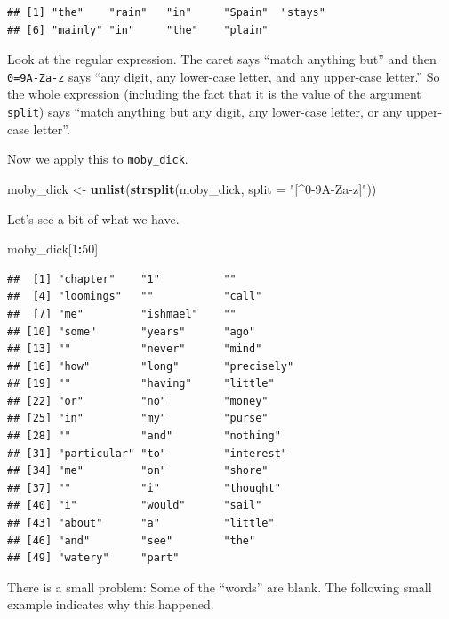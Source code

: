 \documentclass[
]{krantz}
\newenvironment{Shaded}{\begin{snugshade}}{\end{snugshade}}
\newcommand{\DataTypeTok}[1]{\textcolor[rgb]{0.13,0.29,0.53}{#1}}
\newcommand{\DecValTok}[1]{\textcolor[rgb]{0.00,0.00,0.81}{#1}}
\newcommand{\KeywordTok}[1]{\textcolor[rgb]{0.13,0.29,0.53}{\textbf{#1}}}
\newcommand{\NormalTok}[1]{#1}
\newcommand{\OperatorTok}[1]{\textcolor[rgb]{0.81,0.36,0.00}{\textbf{#1}}}
\newcommand{\StringTok}[1]{\textcolor[rgb]{0.31,0.60,0.02}{#1}}
\begin{document}
\begin{verbatim}
## [1] "the"    "rain"   "in"     "Spain"  "stays" 
## [6] "mainly" "in"     "the"    "plain"
\end{verbatim}

Look at the regular expression. The caret says ``match anything but'' and then \texttt{0=9A-Za-z} says ``any digit, any lower-case letter, and any upper-case letter.'' So the whole expression (including the fact that it is the value of the argument \texttt{split}) says ``match anything but any digit, any lower-case letter, or any upper-case letter''.

Now we apply this to \texttt{moby\_dick}.

\begin{Shaded}
\begin{Highlighting}[]
\NormalTok{moby\_dick \textless{}{-}}\StringTok{ }\KeywordTok{unlist}\NormalTok{(}\KeywordTok{strsplit}\NormalTok{(moby\_dick, }\DataTypeTok{split =} \StringTok{"[\^{}0{-}9A{-}Za{-}z]"}\NormalTok{))}
\end{Highlighting}
\end{Shaded}

Let's see a bit of what we have.

\begin{Shaded}
\begin{Highlighting}[]
\NormalTok{moby\_dick[}\DecValTok{1}\OperatorTok{:}\DecValTok{50}\NormalTok{]}
\end{Highlighting}
\end{Shaded}

\begin{verbatim}
##  [1] "chapter"    "1"          ""          
##  [4] "loomings"   ""           "call"      
##  [7] "me"         "ishmael"    ""          
## [10] "some"       "years"      "ago"       
## [13] ""           "never"      "mind"      
## [16] "how"        "long"       "precisely" 
## [19] ""           "having"     "little"    
## [22] "or"         "no"         "money"     
## [25] "in"         "my"         "purse"     
## [28] ""           "and"        "nothing"   
## [31] "particular" "to"         "interest"  
## [34] "me"         "on"         "shore"     
## [37] ""           "i"          "thought"   
## [40] "i"          "would"      "sail"      
## [43] "about"      "a"          "little"    
## [46] "and"        "see"        "the"       
## [49] "watery"     "part"
\end{verbatim}

There is a small problem: Some of the ``words'' are blank. The following small example indicates why this happened.
\end{document}
